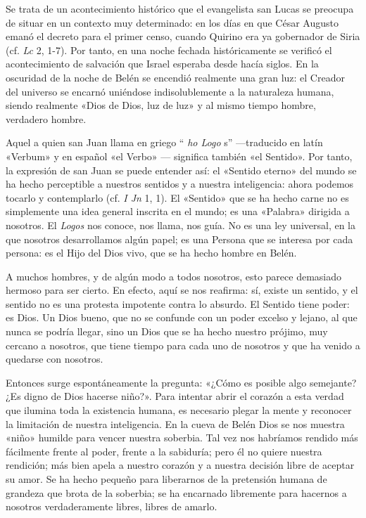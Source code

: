 \documentclass[]{article}
\begin{document}
Se trata de un acontecimiento histórico que el evangelista san Lucas se
preocupa de situar en un contexto muy determinado: en los días en que
César Augusto emanó el decreto para el primer censo, cuando Quirino era
ya gobernador de Siria (cf. \emph{Lc} 2, 1-7). Por tanto, en una noche
fechada históricamente se verificó el acontecimiento de salvación que
Israel esperaba desde hacía siglos. En la oscuridad de la noche de Belén
se encendió realmente una gran luz: el Creador del universo se encarnó
uniéndose indisolublemente a la naturaleza humana, siendo realmente
«Dios de Dios, luz de luz» y al mismo tiempo hombre, verdadero hombre.

Aquel a quien san Juan llama en griego `` \emph{ho Logo} s''
---traducido en latín «Verbum» y en español «el Verbo» --- significa
también «el Sentido». Por tanto, la expresión de san Juan se puede
entender así: el «Sentido eterno» del mundo se ha hecho perceptible a
nuestros sentidos y a nuestra inteligencia: ahora podemos tocarlo y
contemplarlo (cf. \emph{I Jn} 1, 1). El «Sentido» que se ha hecho carne
no es simplemente una idea general inscrita en el mundo; es una
«Palabra» dirigida a nosotros. El \emph{Logos} nos conoce, nos llama,
nos guía. No es una ley universal, en la que nosotros desarrollamos
algún papel; es una Persona que se interesa por cada persona: es el Hijo
del Dios vivo, que se ha hecho hombre en Belén.

A muchos hombres, y de algún modo a todos nosotros, esto parece
demasiado hermoso para ser cierto. En efecto, aquí se nos reafirma: sí,
existe un sentido, y el sentido no es una protesta impotente contra lo
absurdo. El Sentido tiene poder: es Dios. Un Dios bueno, que no se
confunde con un poder excelso y lejano, al que nunca se podría llegar,
sino un Dios que se ha hecho nuestro prójimo, muy cercano a nosotros,
que tiene tiempo para cada uno de nosotros y que ha venido a quedarse
con nosotros.

Entonces surge espontáneamente la pregunta: «¿Cómo es posible algo
semejante? ¿Es digno de Dios hacerse niño?». Para intentar abrir el
corazón a esta verdad que ilumina toda la existencia humana, es
necesario plegar la mente y reconocer la limitación de nuestra
inteligencia. En la cueva de Belén Dios se nos muestra «niño» humilde
para vencer nuestra soberbia. Tal vez nos habríamos rendido más
fácilmente frente al poder, frente a la sabiduría; pero él no quiere
nuestra rendición; más bien apela a nuestro corazón y a nuestra decisión
libre de aceptar su amor. Se ha hecho pequeño para liberarnos de la
pretensión humana de grandeza que brota de la soberbia; se ha encarnado
libremente para hacernos a nosotros verdaderamente libres, libres de
amarlo.
\end{document}
